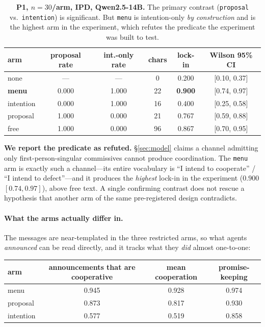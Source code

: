 \begin{table}[t]
\centering
\caption{\textbf{P1, $n{=}30$/arm, IPD, Qwen2.5-14B.} The primary contrast
(\texttt{proposal} vs.\ \texttt{intention}) is significant. But \texttt{menu} is
intention-only \emph{by construction} and is the highest arm in the experiment, which
refutes the predicate the experiment was built to test.}
\label{tab:p1}
\small
\begin{tabular}{lccccc}
\toprule
arm & proposal rate & int.-only rate & chars & lock-in & Wilson 95\% CI \\
\midrule
none      & ---   & ---   & 0  & 0.200 & [0.10, 0.37] \\
\textbf{menu} & 0.000 & 1.000 & 22 & \textbf{0.900} & [0.74, 0.97] \\
intention & 0.000 & 1.000 & 16 & 0.400 & [0.25, 0.58] \\
proposal  & 1.000 & 0.000 & 21 & 0.767 & [0.59, 0.88] \\
free      & 1.000 & 0.000 & 96 & 0.867 & [0.70, 0.95] \\
\bottomrule
\end{tabular}
\end{table}

\textbf{We report the predicate as refuted.} \S\ref{sec:model} claims a channel
admitting only first-person-singular commissives cannot produce coordination. The
\texttt{menu} arm is exactly such a channel---its entire vocabulary is ``I intend to
cooperate'' / ``I intend to defect''---and it produces the \emph{highest} lock-in in
the experiment ($0.900$ $[0.74,0.97]$), above free text. A single confirming contrast
does not rescue a hypothesis that another arm of the same pre-registered design
contradicts.

\paragraph{What the arms actually differ in.}
The messages are near-templated in the three restricted arms, so what agents
\emph{announced} can be read directly, and it tracks what they \emph{did} almost
one-to-one:

\begin{center}
\small
\begin{tabular}{lccc}
\toprule
arm & announcements that are cooperative & mean cooperation & promise-keeping \\
\midrule
menu      & 0.945 & 0.928 & 0.974 \\
proposal  & 0.873 & 0.817 & 0.930 \\
intention & 0.577 & 0.519 & 0.858 \\
\bottomrule
\end{tabular}
\end{center}

